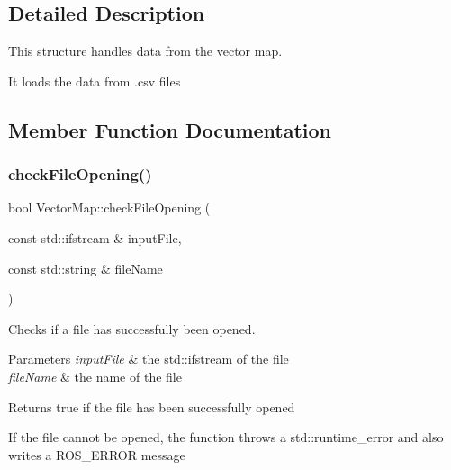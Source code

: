 \subsection{Detailed Description}
This structure handles data from the vector map. 

It loads the data from .csv files 

\subsection{Member Function Documentation}
\mbox{\label{structVectorMap_ae5a2399e6c9fb052c26ca170d211fa32}} 
\subsubsection{\texorpdfstring{check\+File\+Opening()}{checkFileOpening()}}
{\footnotesize\ttfamily bool Vector\+Map\+::check\+File\+Opening (\begin{DoxyParamCaption}\item[{const std\+::ifstream \&}]{input\+File,  }\item[{const std\+::string \&}]{file\+Name }\end{DoxyParamCaption})\hspace{0.3cm}{\ttfamily [inline]}}



Checks if a file has successfully been opened. 


\begin{DoxyParams}{Parameters}
{\em input\+File} & the std\+::ifstream of the file \\
\hline
{\em file\+Name} & the name of the file \\
\hline
\end{DoxyParams}
\begin{DoxyReturn}{Returns}
true if the file has been successfully opened
\end{DoxyReturn}
If the file cannot be opened, the function throws a std\+::runtime\+\_\+error and also writes a R\+O\+S\+\_\+\+E\+R\+R\+OR message \mbox{\label{structVectorMap_a0f3bd8f62ce45cdbeeeefb8bed9048d0}} 
